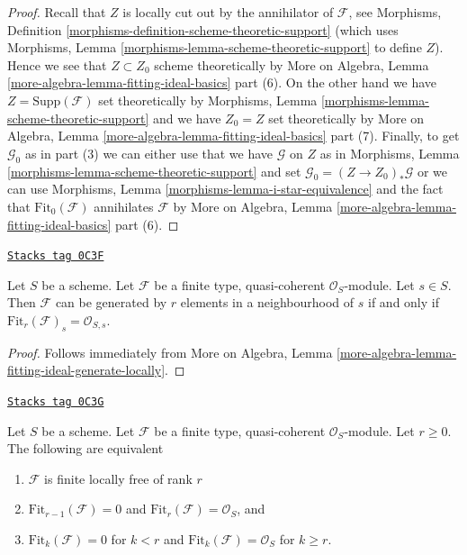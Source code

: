\begin{proof}
Recall that $Z$ is locally cut out by the annihilator of $\mathcal{F}$, see
Morphisms, Definition \ref{morphisms-definition-scheme-theoretic-support}
(which uses Morphisms, Lemma \ref{morphisms-lemma-scheme-theoretic-support}
to define $Z$). Hence we see that $Z \subset Z_0$ scheme theoretically
by More on Algebra, Lemma
\ref{more-algebra-lemma-fitting-ideal-basics} part (6).
On the other hand we have $Z = \text{Supp}(\mathcal{F})$
set theoretically by
Morphisms, Lemma \ref{morphisms-lemma-scheme-theoretic-support}
and we have $Z_0 = Z$ set theoretically by
More on Algebra, Lemma
\ref{more-algebra-lemma-fitting-ideal-basics} part (7).
Finally, to get $\mathcal{G}_0$ as in part (3) we can either use
that we have $\mathcal{G}$ on $Z$ as in
Morphisms, Lemma \ref{morphisms-lemma-scheme-theoretic-support}
and set $\mathcal{G}_0 = (Z \to Z_0)_*\mathcal{G}$
or we can use Morphisms, Lemma \ref{morphisms-lemma-i-star-equivalence}
and the fact that $\text{Fit}_0(\mathcal{F})$ annihilates
$\mathcal{F}$ by More on Algebra, Lemma
\ref{more-algebra-lemma-fitting-ideal-basics} part (6).
\end{proof}

\begin{lemma}
\label{divisors-lemma-fitting-ideal-generate-locally}
\href{https://stacks.math.columbia.edu/tag/0C3F}{\texttt{Stacks tag 0C3F}}

Let $S$ be a scheme. Let $\mathcal{F}$ be a finite type, quasi-coherent
$\mathcal{O}_S$-module. Let $s \in S$. Then $\mathcal{F}$ can be
generated by $r$ elements in a neighbourhood of $s$ if and only
if $\text{Fit}_r(\mathcal{F})_s = \mathcal{O}_{S, s}$.
\end{lemma}

\begin{proof}
Follows immediately from
More on Algebra, Lemma \ref{more-algebra-lemma-fitting-ideal-generate-locally}.
\end{proof}

\begin{lemma}
\label{divisors-lemma-fitting-ideal-finite-locally-free}
\href{https://stacks.math.columbia.edu/tag/0C3G}{\texttt{Stacks tag 0C3G}}

Let $S$ be a scheme. Let $\mathcal{F}$ be a finite type, quasi-coherent
$\mathcal{O}_S$-module. Let $r \geq 0$. The following are equivalent
\begin{enumerate}
\item $\mathcal{F}$ is finite locally free of rank $r$
\item $\text{Fit}_{r - 1}(\mathcal{F}) = 0$ and
$\text{Fit}_r(\mathcal{F}) = \mathcal{O}_S$, and
\item $\text{Fit}_k(\mathcal{F}) = 0$ for $k < r$ and
$\text{Fit}_k(\mathcal{F}) = \mathcal{O}_S$ for $k \geq r$.
\end{enumerate}
\end{lemma}

